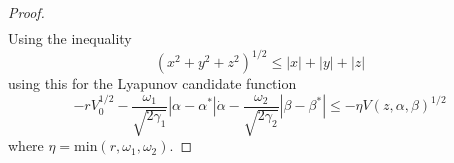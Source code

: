 \begin{proof}
\begin{equation}
\begin{split}
          \end{split}
        \end{equation}
        Using the inequality
        \begin{equation}
          \left(x^2 + y^2 + z^2\right)^{1/2} \leq |x| + |y| + |z|
        \end{equation}
        using this for the Lyapunov candidate function
        \begin{equation}
          -rV_0^{1/2} - \frac{\omega_1}{\sqrt{2\gamma_1}}\left|\alpha - \alpha^*\right|\dot{\alpha} - \frac{\omega_2}{\sqrt{2\gamma_2}} \left|\beta - \beta^*\right| \leq -\eta V(z,\alpha,\beta)^{1/2}
          \label{eq:shtessel-bound-a}
        \end{equation}
        where $\eta = \text{min}(r, \omega_1, \omega_2)$.


\end{proof}
